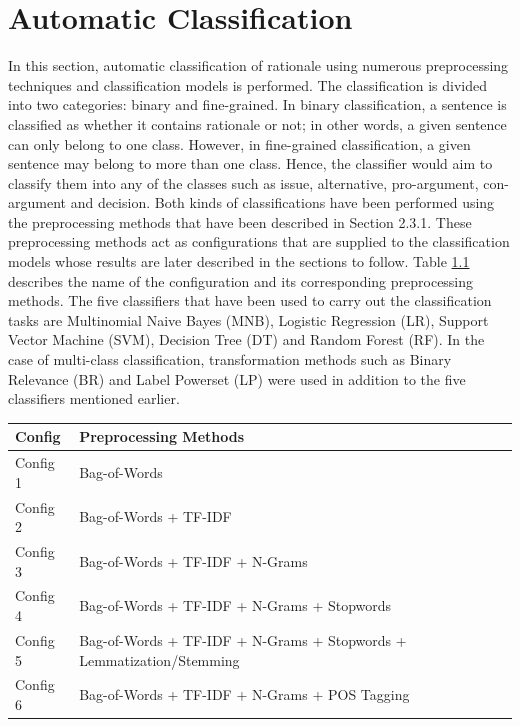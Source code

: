 \documentclass[a4paper,12pt,twoside]{report}
\begin{document}

\chapter{Automatic Classification}

In this section, automatic classification of rationale using numerous preprocessing techniques and classification models is performed. The classification is divided into two categories: binary and fine-grained. In binary classification, a sentence is classified as whether it contains rationale or not; in other words, a given sentence can only belong to one class. However, in fine-grained classification, a given sentence may belong to more than one class. Hence, the classifier would aim to classify them into any of the classes such as issue, alternative, pro-argument, con-argument and decision. 
\bigbreak
Both kinds of classifications have been performed using the preprocessing methods that have been described in Section 2.3.1. These preprocessing methods act as configurations that are supplied to the classification models whose results are later described in the sections to follow. Table \ref{tab:configurationNames} describes the name of the configuration and its corresponding preprocessing methods. The five classifiers that have been used to carry out the classification tasks are Multinomial Naive Bayes (MNB), Logistic Regression (LR), Support Vector Machine (SVM), Decision Tree (DT) and Random Forest (RF). In the case of multi-class classification, transformation methods such as Binary Relevance (BR) and Label Powerset (LP) were used in addition to the five classifiers mentioned earlier. 

\begin{table} %
    \centering
    \begin{adjustbox}{max width=\columnwidth}
    \def\arraystretch{1} %
    \begin{tabular}{p{2cm} p{13cm}}
        \toprule
        \textbf{Config} & \textbf{Preprocessing Methods} \\
        \midrule
			Config 1 & Bag-of-Words \\
			Config 2 & Bag-of-Words + TF-IDF \\ 
			Config 3 & Bag-of-Words + TF-IDF + N-Grams \\
			Config 4 & Bag-of-Words + TF-IDF + N-Grams + Stopwords \\
			Config 5 & Bag-of-Words + TF-IDF + N-Grams + Stopwords + Lemmatization/Stemming \\
			Config 6 & Bag-of-Words + TF-IDF + N-Grams + POS Tagging \\
        \midrule
    \end{tabular}
    \end{adjustbox}
    \label{tab:configurationNames}
\end{table} 
\end{document}
